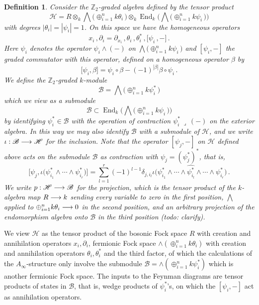\documentclass[english,letter paper,12pt,leqno]{article}
\theoremstyle{example}
\newtheorem{definition}[theorem]{Definition}
\numberwithin{equation}{section}
\def\be{\begin{equation}}
\def\ee{\end{equation}}
\def\nZ{\mathds{Z}}
\DeclareMathOperator{\End}{End}
\begin{document}
\begin{definition} Consider the $\nZ_2$-graded algebra defined by the tensor product
\[
\mathscr{H} = R \otimes_k \bigwedge\big( \oplus_{i=1}^n k \theta_i \,\big) \otimes_k \End_k\Big( \bigwedge\big( \oplus_{i=1}^n k \psi_i \, \big) \Big)
\]
with degrees $|\theta_i| = |\psi_i| = 1$. On this space we have the homogeneous operators
\[
x_i\,, \partial_i = \partial_{x_i}\,, \theta_i\,, \theta_i^*\,, \big[\psi_i\,,-\big]\,.
\]
Here $\psi_i$ denotes the operator $\psi_i \wedge (-)$ on $\bigwedge\big( \oplus_{i=1}^n k \psi_i \, \big)$ and $[ \psi_i, - ]$ the graded commutator with this operator, defined on a homogeneous operator $\beta$ by
\[
\big[ \psi_i, \beta \big] = \psi_i \circ \beta - (-1)^{|\beta|} \beta \circ \psi_i\,.
\]
We define the $\nZ_2$-graded $k$-module
\be\label{defn:B}
\mathscr{B} = \bigwedge\big( \oplus_{i=1}^n k \psi_i^* \,\big)
\ee
which we view as a submodule
\[
\mathscr{B} \subset \End_k\Big( \bigwedge\big( \oplus_{i=1}^n k \psi_i \, \big) \Big)
\]
by identifying $\psi_i^* \in \mathscr{B}$ with the operation of contraction $\psi_i^*\, \lrcorner\, (-)$ on the exterior algebra. In this way we may also identify $\mathscr{B}$ with a submodule of $\mathscr{H}$, and we write $\iota: \mathscr{B} \longrightarrow \mathscr{H}$ for the inclusion. Note that the operator $[\psi_j, -]$ on $\mathscr{H}$ defined above acts on the submodule $\mathscr{B}$ as contraction with $\psi_j = (\psi_j^*)^*$, that is,
\be\label{eq:comm_is_ann}
\Big[ \psi_j, \iota\big(\psi_{i_1}^* \wedge \cdots \wedge \psi_{i_r}^*\big) \Big] = \sum_{l=1}^r (-1)^{l-1} \delta_{j, i_l} \iota\big(\psi_{i_1}^* \wedge \cdots \wedge \widehat{ \psi_{i_l}^* } \wedge \cdots \wedge \psi_{i_r}^*\big)\,.
\ee
We write $p: \mathscr{H} \longrightarrow \mathscr{B}$ for the projection, which is the tensor product of the $k$-algebra map $R \longrightarrow k$ sending every variable to zero in the first position, $\bigwedge$ applied to $\oplus_{i=1}^n k \theta_i \longrightarrow 0$ in the second position, and an arbitrary projection of the endomorphism algebra onto $\mathscr{B}$ in the third position (todo: clarify).
\end{definition}

We view $\mathscr{H}$ as the tensor product of the bosonic Fock space $R$ with creation and annihilation operators $x_i, \partial_i$, fermionic Fock space $\wedge( \oplus_{i=1}^n k \theta_i )$ with creation and annihilation operators $\theta_i, \theta_i^*$ and the third factor, of which the calculations of the $A_\infty$-structure only involve the submodule $\mathscr{B} = \wedge( \oplus_{i=1}^n k \psi_i^* )$ which is another fermionic Fock space. The inputs to the Feynman diagrams are tensor products of states in $\mathscr{B}$, that is, wedge products of $\psi_i^*$'s, on which the $[\psi_i, -]$ act as annihilation operators.
\end{document}

